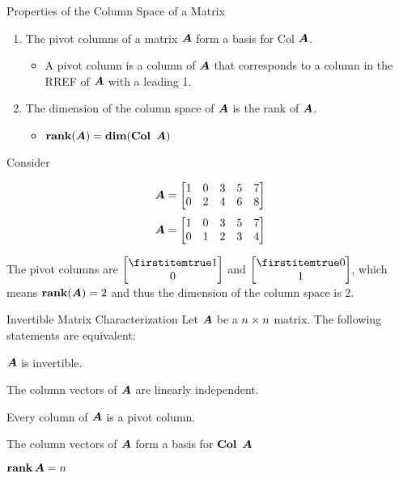 \documentclass{beamer}
\begin{document}
\begin{frame}
\begin{block}{Properties of the Column Space of a Matrix}
\begin{enumerate}
\item The pivot columns of a matrix $\boldsymbol{A}$ form a basis for Col $\boldsymbol{A}$.
\begin{itemize}
\item A pivot column is a column of $\boldsymbol{A}$ that corresponds to a column in the RREF of $\boldsymbol{A}$ with a leading 1.
\end{itemize}
\item The dimension of the column space of $\boldsymbol{A}$ is the rank of $\boldsymbol{A}$.
\begin{itemize}
\item $\rank(\mat{A})=\dimension(\Col\mat{A})$
\end{itemize}
\end{enumerate}
\end{block}

\begin{example}
Consider
\begin{overprint}
\begin{equation*}
\boldsymbol{A}=
\begin{bmatrix}
1 & 0 & 3 & 5 & 7\\
0 & 2 & 4 & 6 & 8\\
\end{bmatrix}
\end{equation*}
\begin{equation*}
\boldsymbol{A}=
\begin{bmatrix}
1 & 0 & 3 & 5 & 7\\
0 & 1 & 2 & 3 & 4\\
\end{bmatrix}
\end{equation*}
\end{overprint}
The pivot columns are $\bvector{1,0}$ and $\bvector{0,1}$, which means $\operatorname{\textbf{rank}}(\boldsymbol{A})=2$ and thus the dimension of the column space is 2.
\end{example}
\end{frame}

\begin{frame}
\begin{block}{Invertible Matrix Characterization}
Let $\boldsymbol{A}$ be a $n \times n$ matrix. The following statements are equivalent:
\begin{dynitemize}[<+- | alert@+>]
\item $\boldsymbol{A}$ is invertible.
\item The column vectors of $\boldsymbol{A}$ are linearly independent.
\item Every column of $\boldsymbol{A}$ is a pivot column.
\item The column vectors of $\boldsymbol{A}$ form a basis for $\Col\mat{A}$
\item $\operatorname{\textbf{rank}}\boldsymbol{A}=n$
\end{dynitemize}
\end{block}
\end{frame}
\end{document}
